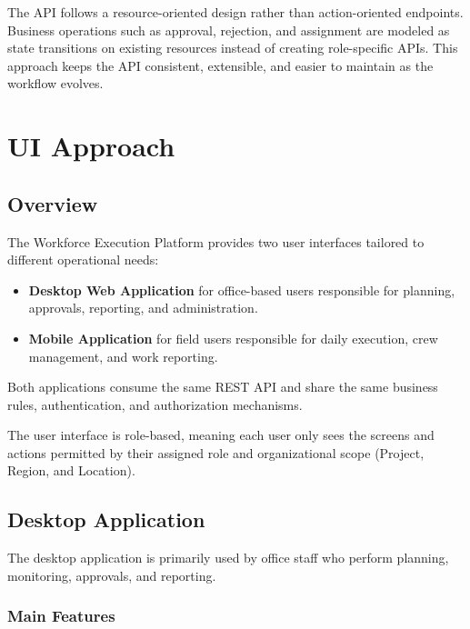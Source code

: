 \documentclass[11pt]{article}
\begin{document}
The API follows a resource-oriented design rather than action-oriented
endpoints. Business operations such as approval, rejection, and assignment are
modeled as state transitions on existing resources instead of creating
role-specific APIs. This approach keeps the API consistent, extensible, and
easier to maintain as the workflow evolves.

\clearpage
\section{UI Approach}

\subsection{Overview}

The Workforce Execution Platform provides two user interfaces tailored to
different operational needs:

\begin{itemize}
    \item \textbf{Desktop Web Application} for office-based users responsible
          for planning, approvals, reporting, and administration.
    \item \textbf{Mobile Application} for field users responsible for daily
          execution, crew management, and work reporting.
\end{itemize}

Both applications consume the same REST API and share the same business rules,
authentication, and authorization mechanisms.

The user interface is role-based, meaning each user only sees the screens and
actions permitted by their assigned role and organizational scope (Project,
Region, and Location).

\subsection{Desktop Application}

The desktop application is primarily used by office staff who perform planning,
monitoring, approvals, and reporting.

\subsubsection*{Main Features}
\end{document}
